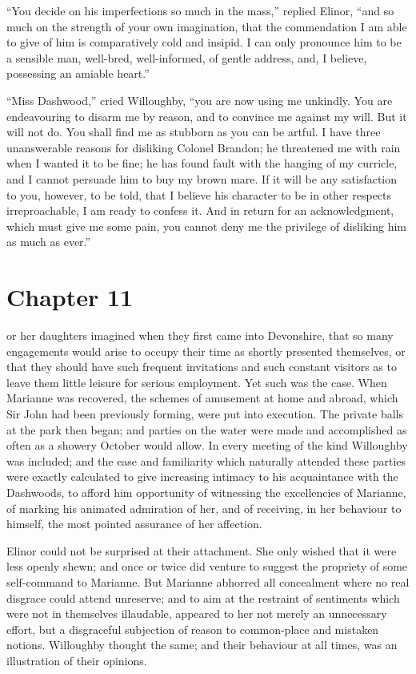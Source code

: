 ``You decide on his imperfections so much in the mass,''
replied Elinor, ``and so much on the strength of your
own imagination, that the commendation I am able to give
of him is comparatively cold and insipid.  I can only
pronounce him to be a sensible man, well-bred, well-informed,
of gentle address, and, I believe, possessing an amiable heart.''

``Miss Dashwood,'' cried Willoughby, ``you are now using
me unkindly.  You are endeavouring to disarm me by reason,
and to convince me against my will.  But it will not do.
You shall find me as stubborn as you can be artful.  I have
three unanswerable reasons for disliking Colonel Brandon;
he threatened me with rain when I wanted it to be fine;
he has found fault with the hanging of my curricle,
and I cannot persuade him to buy my brown mare.  If it
will be any satisfaction to you, however, to be told,
that I believe his character to be in other respects
irreproachable, I am ready to confess it.  And in return
for an acknowledgment, which must give me some pain,
you cannot deny me the privilege of disliking him as much
as ever.''



\chapter{Chapter 11}


 or her daughters imagined
when they first came into Devonshire, that so many
engagements would arise to occupy their time as shortly
presented themselves, or that they should have such frequent
invitations and such constant visitors as to leave them little
leisure for serious employment.  Yet such was the case.
When Marianne was recovered, the schemes of amusement at home
and abroad, which Sir John had been previously forming,
were put into execution.  The private balls at the park
then began; and parties on the water were made and
accomplished as often as a showery October would allow.
In every meeting of the kind Willoughby was included;
and the ease and familiarity which naturally attended
these parties were exactly calculated to give increasing
intimacy to his acquaintance with the Dashwoods, to afford
him opportunity of witnessing the excellencies of Marianne,
of marking his animated admiration of her, and of receiving,
in her behaviour to himself, the most pointed assurance
of her affection.

Elinor could not be surprised at their attachment.
She only wished that it were less openly shewn; and once
or twice did venture to suggest the propriety of some
self-command to Marianne.  But Marianne abhorred all
concealment where no real disgrace could attend unreserve;
and to aim at the restraint of sentiments which were not
in themselves illaudable, appeared to her not merely
an unnecessary effort, but a disgraceful subjection
of reason to common-place and mistaken notions.
Willoughby thought the same; and their behaviour at
all times, was an illustration of their opinions.

